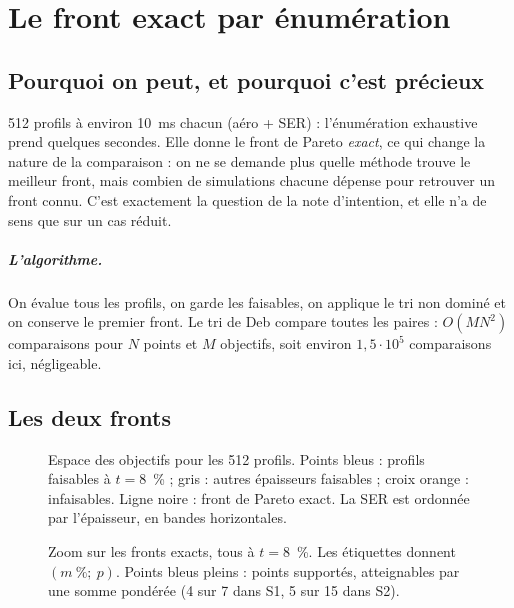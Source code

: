 \chapter{Le front exact par énumération}\label{ch:exact}

\section{Pourquoi on peut, et pourquoi c'est précieux}
512 profils à environ 10~ms chacun (aéro + SER) : l'énumération exhaustive prend quelques secondes. Elle donne le front de Pareto \emph{exact}, ce qui change la nature de la comparaison : on ne se demande plus quelle méthode trouve le meilleur front, mais combien de simulations chacune dépense pour retrouver un front connu. C'est exactement la question de la note d'intention, et elle n'a de sens que sur un cas réduit.

\paragraph{L'algorithme.} On évalue tous les profils, on garde les faisables, on applique le tri non dominé et on conserve le premier front. Le tri de Deb compare toutes les paires : $O(MN^2)$ comparaisons pour $N$ points et $M$ objectifs, soit environ $1{,}5\cdot10^5$ comparaisons ici, négligeable.

\section{Les deux fronts}
\begin{figure}[htbp]
\centering

\caption{Espace des objectifs pour les 512 profils. Points bleus : profils faisables à $t=8$~\% ; gris : autres épaisseurs faisables ; croix orange : infaisables. Ligne noire : front de Pareto exact. La SER est ordonnée par l'épaisseur, en bandes horizontales.}\label{fig:objectifs}
\end{figure}

\begin{figure}[htbp]
\centering

\caption{Zoom sur les fronts exacts, tous à $t=8$~\%. Les étiquettes donnent $(m~\%;\ p)$. Points bleus pleins : points supportés, atteignables par une somme pondérée (4 sur 7 dans S1, 5 sur 15 dans S2).}\label{fig:fronts}
\end{figure}

